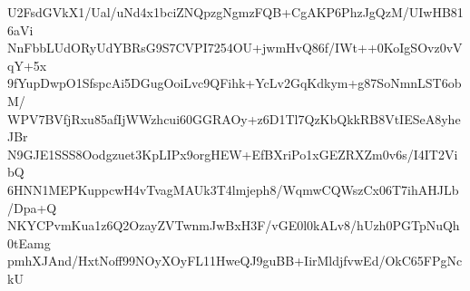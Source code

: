 U2FsdGVkX1/Ual/uNd4x1bciZNQpzgNgmzFQB+CgAKP6PhzJgQzM/UIwHB816aVi
NnFbbLUdORyUdYBRsG9S7CVPI7254OU+jwmHvQ86f/IWt++0KoIgSOvz0vVqY+5x
9fYupDwpO1SfspcAi5DGugOoiLvc9QFihk+YcLv2GqKdkym+g87SoNmnLST6obM/
WPV7BVfjRxu85afIjWWzhcui60GGRAOy+z6D1Tl7QzKbQkkRB8VtIESeA8yheJBr
N9GJE1SSS8Oodgzuet3KpLIPx9orgHEW+EfBXriPo1xGEZRXZm0v6s/I4IT2VibQ
6HNN1MEPKuppcwH4vTvagMAUk3T4lmjeph8/WqmwCQWszCx06T7ihAHJLb/Dpa+Q
NKYCPvmKua1z6Q2OzayZVTwnmJwBxH3F/vGE0l0kALv8/hUzh0PGTpNuQh0tEamg
pmhXJAnd/HxtNoff99NOyXOyFL11HweQJ9guBB+IirMldjfvwEd/OkC65FPgNckU
